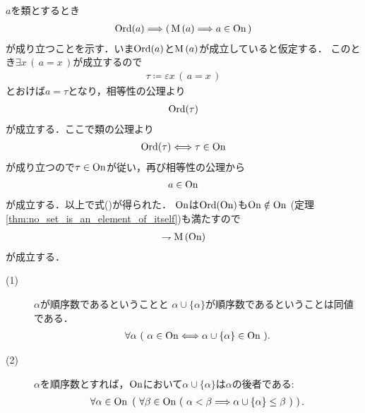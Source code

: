 	\begin{prf}
		$a$を類とするとき
		\begin{align}
			\operatorname*{Ord}(a) \Longrightarrow \left(\, \operatorname*{M}\left(a\right) \Longrightarrow a \in \mathrm{On}\, \right)
			\label{eq:Burali_Forti_1}
		\end{align}
		が成り立つことを示す．いま$\operatorname*{Ord}(a)$と$\operatorname*{M}\left(a\right)$が成立していると仮定する．
		このとき$\exists x\, (\, a = x\, )$が成立するので
		\begin{align}
			\tau \coloneqq \varepsilon x\, (\, a = x\, )
		\end{align}
		とおけば$a = \tau$となり，相等性の公理より
		\begin{align}
			\operatorname*{Ord}(\tau)
		\end{align}
		が成立する．ここで類の公理より
		\begin{align}
			\operatorname*{Ord}(\tau) \Longleftrightarrow \tau \in \mathrm{On}
		\end{align}
		が成り立つので$\tau \in \mathrm{On}$が従い，再び相等性の公理から
		\begin{align}
			a \in \mathrm{On}
		\end{align}
		が成立する．以上で式()が得られた．
		$\mathrm{On}$は$\operatorname*{Ord}(\mathrm{On})$も$\mathrm{On} \notin \mathrm{On}$
		(定理\ref{thm:no_set_is_an_element_of_itself})も満たすので
		\begin{align}
			\rightharpoondown \operatorname*{M}\left(\mathrm{On}\right)
		\end{align}
		が成立する．
		\QED
	\end{prf}
	
	\begin{screen}
		\begin{thm}[順序数は自分自身との合併が後者となる]\mbox{}
			\begin{description}
				\item[(1)] $\alpha$が順序数であるということと $\alpha \cup \{\alpha\}$が順序数であるということは同値である．
					\begin{align}
						\forall \alpha\ (\ \alpha \in \mathrm{On} \Longleftrightarrow \alpha \cup \{\alpha\} \in \mathrm{On}\ ).
					\end{align}
				
				\item[(2)] $\alpha$を順序数とすれば，$\mathrm{On}$において$\alpha \cup \{\alpha\}$は$\alpha$の後者である:
					\begin{align}
						\forall \alpha \in \ON\ 
						\left(\ \forall \beta \in \ON\ (\ \alpha < \beta 
						\Longrightarrow \alpha \cup \{\alpha\} \leq \beta\ )
						\ \right).
					\end{align}
			\end{description}
		\end{thm}
	\end{screen}
	
